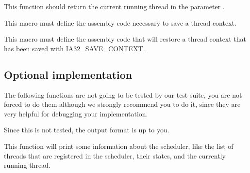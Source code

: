 {
  This function should return the current running thread in the parameter
  .
}

{
  This macro must define the assembly code necessary to save a thread context.
}

{
  This macro must define the assembly code that will restore a thread context
  that has been saved with IA32\_SAVE\_CONTEXT.
}

\subsection*{Optional implementation}

The following functions are not going to be tested by our test suite, you are
not forced to do them although we strongly recommend you to do it, since they
are very helpful for debugging your implementation.

\-

Since this is not tested, the output format is up to you.

{
  This function will print some information about the scheduler, like the list
  of threads that are registered in the scheduler, their states, and the
  currently running thread.
}

